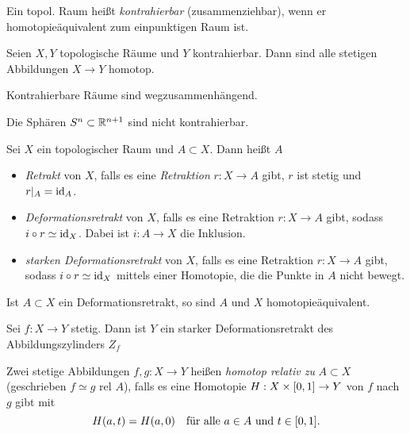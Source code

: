 \documentclass{cheat-sheet}
\newcommand{\rel}{\text{ rel }} %
\begin{document}
\begin{defn}
  Ein topol. Raum heißt \emph{kontrahierbar} (zusammenziehbar), wenn er homotopieäquivalent zum einpunktigen Raum ist.
\end{defn}

\begin{lem}
  Seien $X, Y$ topologische Räume und $Y$ kontrahierbar. Dann sind alle stetigen Abbildungen $X \to Y$ homotop.
\end{lem}

\begin{kor}
  Kontrahierbare Räume sind wegzusammenhängend.
\end{kor}

\begin{prop}
  Die Sphären $S^n \subset \mathbb{R}^{n+1}$ sind nicht kontrahierbar.
\end{prop}

\begin{defn}
  Sei $X$ ein topologischer Raum und $A \subset X$. Dann heißt $A$
  \begin{itemize}
    \item \emph{Retrakt} von $X$, falls es eine \emph{Retraktion} $r : X \to A$ gibt, \dh{} $r$ ist stetig und $r|_A = \mathrm{id}_A$.
    \item \emph{Deformationsretrakt} von $X$, falls es eine Retraktion $r : X \to A$ gibt, sodass $i \circ r \simeq \mathrm{id}_X$. Dabei ist $i : A \to X$ die Inklusion.
    \item \emph{starken Deformationsretrakt} von $X$, falls es eine Retraktion $r : X \to A$ gibt, sodass $i \circ r \simeq \mathrm{id}_X$ mittels einer Homotopie, die die Punkte in $A$ nicht bewegt.
  \end{itemize}
\end{defn}

\begin{bem}
  Ist $A \subset X$ ein Deformationsretrakt, so sind $A$ und $X$ homotopieäquivalent.
\end{bem}

\begin{bsp}
  Sei $f : X \to Y$ stetig. Dann ist $Y$ ein starker Deformationsretrakt des Abbildungszylinders $Z_f$
\end{bsp}


\begin{defn}
  Zwei stetige Abbildungen $f, g : X \to Y$ heißen \emph{homotop relativ zu} $A \subset X$ (geschrieben $f \simeq g \rel A$), falls es eine Homotopie $H : X \times \left[ 0, 1 \right] \to Y$ von $f$ nach $g$ gibt mit
  \[
    H(a,t) = H(a,0) \quad
    \text{für alle $a \in A$ und $t \in \left[ 0, 1 \right]$.}
  \]
\end{defn}
\end{document}
